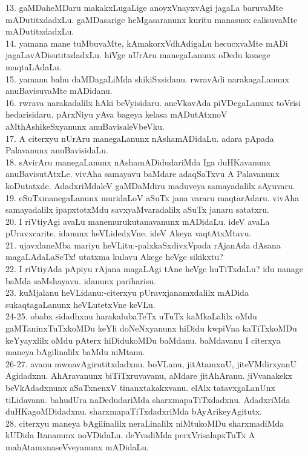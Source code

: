 \documentclass{article}
\begin{document}
13. gaMDaheMDaru makakxLugaLige anoyxVnayxvAgi jagaLa baruvaMte mADutitxdadxLu. gaMDasarige heMgasaranunx kuritu manasusx calisuvaMte mADutitxdadxLu.\\
14. yamana mane tuMbuvaMte, kAmakorxVdhAdigaLu hecucxvaMte mADi jagaLavADisutitxdadxLu. hiVge nUrAru manegaLanunx oDedu konege maqtaLAdaLu.\\
15. yamanu bahu daMDagaLiMda shikiSxsidanu. rwravAdi narakagaLanunx anuBavisuvaMte mADidanu.\\
16. rwrava narakadalilx hAki beVyisidaru. aneVkavAda piVDegaLanunx toVrisi hedarisidaru. pArxNiyu yAva bageya kelasa mADutAtxnoV aMthAshikeSxyanunx anuBavisaleVbeVku.\\
17. A citerxyu nUrAru manegaLanunx nAshamADidaLu. adara pApada Palavanunx anuBavisidaLu.\\
18. sAvirAru manegaLanunx nAshamADidudariMda Iga duHKavanunx anuBavisutAtxLe. vivAha samayavu baMdare adaqSaTxvu A Palavanunx koDutatxde. AdadxriMdaleV gaMDaMdiru maduveya samayadalilx sAyuvaru.\\
19. eSuTxmanegaLanunx muridaLoV aSuTx jana vararu maqtarAdaru. vivAha samayadalilx ipapxtotxMdu savxyaMvaradalilx aSuTx janaru satatxru.\\
20. I riVtiyAgi avaLu manemurukutanavanunx mADidaLu. ideV avaLa pUravxcarite. idanunx heVLidedxVne. ideV Akeya vaqtAtxMtavu.\\
21. ujavxlaneMba mariyu heVLitu:-palxkaSxdivxVpada rAjanAda dAsana magaLAdaLaSeTx! utatxma kulavu Akege heVge sikikxtu?\\
22. I riVtiyAda pApiyu rAjana magaLAgi tAne heVge huTiTxdaLu? idu nanage baMda saMshayavu. idanunx pariharisu.\\
23. kuMjalanu heVLidanu:-citerxyu pUravxjanamxdalilx mADida sukaqtagaLanunx heVLutetxVne keVLu.\\
24-25. obabx sidadhxnu harakalubaTeTx uTuTx kaMkaLalilx oMdu gaMTaninxTuTxkoMDu keYli doNeNxyanunx hiDidu kwpiVna kaTiTxkoMDu keYyayxlilx oMdu pAterx hiDidukoMDu baMdanu. baMdavanu I citerxya maneya bAgilinalilx baMdu niMtanu.\\
26-27. avanu mwnavAgirutitxdadxnu. boVLanu, jitAtamxnU, jiteVMdirxyanU Agidadxnu. AhAravanunx biTiTxruvavanu, aMdare jitAhAranu. jiVvanakekx beVkAdadxnunx aSaTxnenxV tinanxtakakxvanu. elAlx tatavxgaLanUnx tiLidavanu. bahudUra naDedudariMda sharxmapaTiTxdadxnu. AdadxriMda duHKagoMDidadxnu. sharxmapaTiTxdadxriMda bAyArikeyAgitutx.\\
28. citerxyu maneya bAgilinalilx neraLinalilx niMtukoMDu sharxmadiMda kUDida Itananunx noVDidaLu. deYvadiMda perxVrisalapxTuTx A mahAtamxnaseVveyanunx mADidaLu.\\
\end{document}

